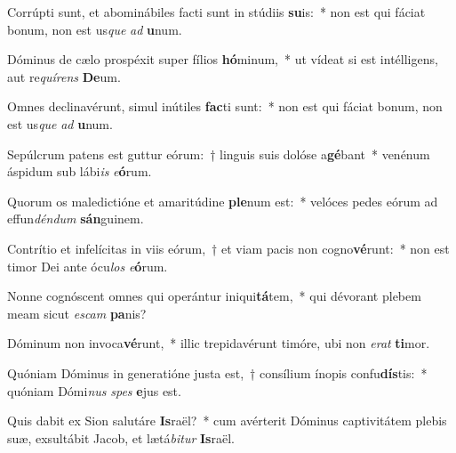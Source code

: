\item Corrúpti sunt, et abominábiles facti sunt in stúdiis \textbf{su}is:~* non est qui fáciat bonum, non est us\textit{que} \textit{ad} \textbf{u}num.
\item Dóminus de cælo prospéxit super fílios \textbf{hó}minum,~* ut vídeat si est intélligens, aut re\textit{quí}\textit{rens} \textbf{De}um.
\item Omnes declinavérunt, simul inútiles \textbf{fac}ti sunt:~* non est qui fáciat bonum, non est us\textit{que} \textit{ad} \textbf{u}num.
\item Sepúlcrum patens est guttur eórum:~† linguis suis dolóse a\textbf{gé}bant~* venénum áspidum sub lábi\textit{is} \textit{e}\textbf{ó}rum.
\item Quorum os maledictióne et amaritúdine \textbf{ple}num est:~* velóces pedes eórum ad effun\textit{dén}\textit{dum} \textbf{sán}guinem.
\item Contrítio et infelícitas in viis eórum,~† et viam pacis non cogno\textbf{vé}runt:~* non est timor Dei ante ócu\textit{los} \textit{e}\textbf{ó}rum.
\item Nonne cognóscent omnes qui operántur iniqui\textbf{tá}tem,~* qui dévorant plebem meam sicut \textit{es}\textit{cam} \textbf{pa}nis?
\item Dóminum non invoca\textbf{vé}runt,~* illic trepidavérunt timóre, ubi non \textit{e}\textit{rat} \textbf{ti}mor.
\item Quóniam Dóminus in generatióne justa est,~† consílium ínopis confu\textbf{dís}tis:~* quóniam Dómi\textit{nus} \textit{spes} \textbf{e}jus est.
\item Quis dabit ex Sion salutáre \textbf{Is}raël?~* cum avérterit Dóminus captivitátem plebis suæ, exsultábit Jacob, et lætá\textit{bi}\textit{tur} \textbf{Is}raël.
